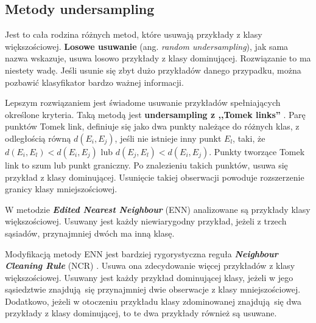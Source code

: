 \subsection{Metody undersampling}
Jest to cała rodzina różnych metod, które usuwają przykłady z klasy większościowej. \textbf{Losowe usuwanie} (ang. \textit{random undersampling}), jak sama nazwa wskazuje, usuwa losowo przykłady z klasy dominującej. Rozwiązanie to ma niestety wadę. Jeśli usunie się zbyt dużo przykładów danego przypadku, można pozbawić klasyfikator bardzo ważnej informacji. \par
Lepszym rozwiązaniem jest świadome usuwanie przykładów spełniających określone kryteria. Taką metodą jest \textbf{undersampling z ,,Tomek links''} \cite{tomelinksc}. Parę punktów Tomek link, definiuje się jako dwa punkty należące do różnych klas, z odległością równą $d(E_i,E_j)$, jeśli nie istnieje inny punkt $E_l$, taki, że $d(E_i,E_l) < d(E_i,E_j)$ lub $d(E_j,E_l) < d(E_i,E_j)$. Punkty tworzące Tomek link to szum lub punkt graniczny. Po znalezieniu takich punktów, usuwa się przykład z klasy dominującej. Usunięcie takiej obserwacji powoduje rozszerzenie granicy klasy mniejszościowej. \par
W metodzie \textbf{\textit{Edited Nearest Neighbour}} (ENN) \cite{enn} analizowane są przykłady klasy większościowej. Usuwany jest każdy niewiarygodny przykład, jeżeli z trzech sąsiadów, przynajmniej dwóch ma inną klasę. \par
Modyfikacją metody ENN jest bardziej rygorystyczna reguła \textbf{\textit{Neighbour Cleaning Rule}} (NCR) \cite{ncr}. Usuwa ona zdecydowanie więcej przykładów z klasy większościowej. Usuwany jest każdy przykład dominującej klasy, jeżeli w jego sąsiedztwie znajdują się przynajmniej dwie obserwacje z klasy mniejszościowej. Dodatkowo, jeżeli w otoczeniu przykładu klasy zdominowanej znajdują się dwa przykłady z klasy dominującej, to te dwa przykłady również są usuwane.

